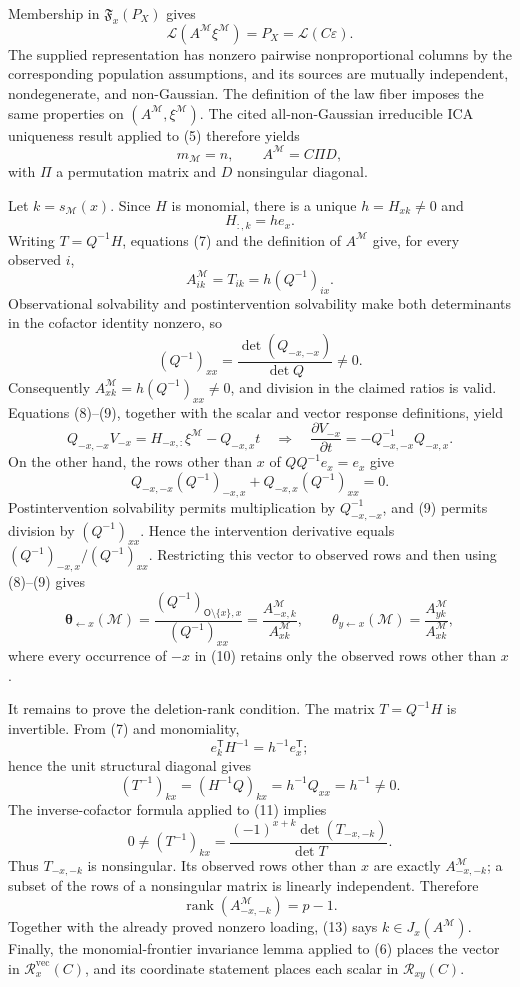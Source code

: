 Membership in \(\mathfrak F_x(P_X)\) gives
\[
\mathcal L(A^{\mathcal M}\xi^{\mathcal M})=P_X=\mathcal L(C\varepsilon). \tag{5}
\]
The supplied representation has nonzero pairwise nonproportional columns by the corresponding population assumptions, and its sources are mutually independent, nondegenerate, and non-Gaussian. The definition of the law fiber imposes the same properties on \((A^{\mathcal M},\xi^{\mathcal M})\). The cited all-non-Gaussian irreducible ICA uniqueness result applied to (5) therefore yields
\[
m_{\mathcal M}=n,\qquad A^{\mathcal M}=C\Pi D, \tag{6}
\]
with \(\Pi\) a permutation matrix and \(D\) nonsingular diagonal.

Let \(k=s_{\mathcal M}(x)\). Since \(H\) is monomial, there is a unique \(h=H_{xk}\ne0\) and
\[
H_{:,k}=h e_x. \tag{7}
\]
Writing \(T=Q^{-1}H\), equations (7) and the definition of \(A^{\mathcal M}\) give, for every observed \(i\),
\[
A^{\mathcal M}_{ik}=T_{ik}=h(Q^{-1})_{ix}. \tag{8}
\]
Observational solvability and postintervention solvability make both determinants in the cofactor identity nonzero, so
\[
(Q^{-1})_{xx}=\frac{\det(Q_{-x,-x})}{\det Q}\ne0. \tag{9}
\]
Consequently \(A^{\mathcal M}_{xk}=h(Q^{-1})_{xx}\ne0\), and division in the claimed ratios is valid. Equations (8)--(9), together with the scalar and vector response definitions, yield
\[
Q_{-x,-x}V_{-x}=H_{-x,:}\xi^{\mathcal M}-Q_{-x,x}t
\quad\Longrightarrow\quad
\frac{\partial V_{-x}}{\partial t}=-Q_{-x,-x}^{-1}Q_{-x,x}.
\]
On the other hand, the rows other than \(x\) of \(QQ^{-1}e_x=e_x\) give
\[
Q_{-x,-x}(Q^{-1})_{-x,x}+Q_{-x,x}(Q^{-1})_{xx}=0.
\]
Postintervention solvability permits multiplication by \(Q_{-x,-x}^{-1}\), and (9) permits division by \((Q^{-1})_{xx}\). Hence the intervention derivative equals \((Q^{-1})_{-x,x}/(Q^{-1})_{xx}\). Restricting this vector to observed rows and then using (8)--(9) gives
\[
\boldsymbol\theta_{\leftarrow x}(\mathcal M)
=\frac{(Q^{-1})_{\mathsf O\setminus\{x\},x}}{(Q^{-1})_{xx}}
=\frac{A^{\mathcal M}_{-x,k}}{A^{\mathcal M}_{xk}},
\qquad
\theta_{y\leftarrow x}(\mathcal M)
=\frac{A^{\mathcal M}_{yk}}{A^{\mathcal M}_{xk}}, \tag{10}
\]
where every occurrence of \(-x\) in (10) retains only the observed rows other than \(x\).

It remains to prove the deletion-rank condition. The matrix \(T=Q^{-1}H\) is invertible. From (7) and monomiality,
\[
e_k^{\mathsf T}H^{-1}=h^{-1}e_x^{\mathsf T};
\]
hence the unit structural diagonal gives
\[
(T^{-1})_{kx}=(H^{-1}Q)_{kx}=h^{-1}Q_{xx}=h^{-1}\ne0. \tag{11}
\]
The inverse-cofactor formula applied to (11) implies
\[
0\ne (T^{-1})_{kx}
=\frac{(-1)^{x+k}\det(T_{-x,-k})}{\det T}. \tag{12}
\]
Thus \(T_{-x,-k}\) is nonsingular. Its observed rows other than \(x\) are exactly \(A^{\mathcal M}_{-x,-k}\); a subset of the rows of a nonsingular matrix is linearly independent. Therefore
\[
\operatorname{rank}(A^{\mathcal M}_{-x,-k})=p-1. \tag{13}
\]
Together with the already proved nonzero loading, (13) says \(k\in J_x(A^{\mathcal M})\). Finally, the monomial-frontier invariance lemma applied to (6) places the vector in \(\mathcal R_x^{\mathrm{vec}}(C)\), and its coordinate statement places each scalar in \(\mathcal R_{xy}(C)\).